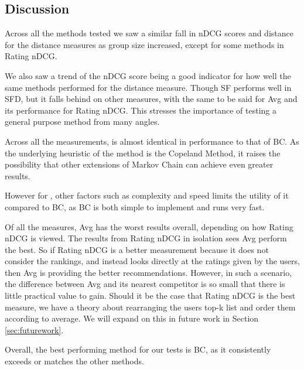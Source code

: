 \subsection{Discussion} \label{sec:discussion}

Across all the methods tested we saw a similar fall in nDCG scores and distance for the distance measures as group size increased, except for some methods in Rating nDCG.

We also saw a trend of the nDCG score being a good indicator for how well the same  methods performed for the distance measure. Though SF performs well in SFD, but it falls behind on other measures, with the same to be said for Avg and its performance for Rating nDCG. This stresses the importance of testing a general purpose method from many angles.

Across all the measurements, \MC is almost identical in performance to that of BC. As the underlying heuristic of the \MC method is the Copeland Method, it raises the possibility that other extensions of Markov Chain can achieve even greater results.

However for \MC, other factors such as complexity and speed limits the utility of it compared to BC, as BC is both simple to implement and runs very fast.

Of all the measures, Avg has the worst results overall, depending on how Rating nDCG is viewed. The results from Rating nDCG in isolation sees Avg perform the best. So if Rating nDCG is a better measurement because it does not consider the rankings, and instead looks directly at the ratings given by the users, then Avg is providing the better recommendations. However, in such a scenario, the difference between Avg and its nearest competitor is so small that there is little practical value to gain. Should it be the case that Rating nDCG is the best measure, we have a theory about rearranging the users top-k list and order them according to average. We will expand on this in future work in Section \ref{sec:futurework}.

Overall, the best performing method for our tests is BC, as it consistently exceeds or matches the other methods.



